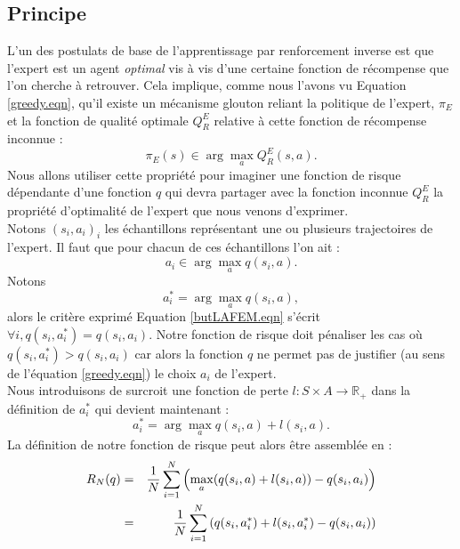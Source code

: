 \documentclass[publibook-draft]{CAp2012}
\begin{document}
\subsection{Principe}
L'un des postulats de base de l'apprentissage par renforcement inverse est que l'expert est un agent \emph{optimal} vis à vis d'une certaine fonction de récompense que l'on cherche à retrouver. Cela implique, comme nous l'avons vu Equation \eqref{greedy.eqn}, qu'il existe un mécanisme glouton reliant la politique de l'expert, $\pi_E$ et la fonction de qualité optimale $Q^E_R$ relative à cette fonction de récompense inconnue :
\begin{equation}
\pi_E(s) \in \arg\max_aQ^E_R(s,a).
\end{equation}
Nous allons utiliser cette propriété pour imaginer une fonction de risque dépendante d'une fonction $q$ qui devra partager avec la fonction inconnue $Q^E_R$ la propriété d'optimalité de l'expert que nous venons d'exprimer.\\
Notons $(s_i,a_i)_i$ les échantillons représentant une ou plusieurs trajectoires de l'expert. Il faut que pour chacun de ces échantillons l'on ait :
\begin{equation}
\label{butLAFEM.eqn}
a_i \in \arg\max_aq(s_i,a).
\end{equation}
Notons
\begin{equation}
a^*_i = \arg\max_aq(s_i,a),
\end{equation}
alors le critère exprimé Equation \eqref{butLAFEM.eqn} s'écrit $\forall i, q(s_i,a^*_i) = q(s_i,a_i)$. Notre fonction de risque doit pénaliser les cas où $q(s_i,a^*_i)>q(s_i,a_i)$ car alors la fonction $q$ ne permet pas de justifier (au sens de l'équation \eqref{greedy.eqn}) le choix $a_i$ de l'expert.\\
Nous introduisons de surcroit une fonction de perte $l : S \times A \rightarrow \mathbb{R}_+$ dans la définition de $a^*_i$ qui devient maintenant :
\begin{equation}
\label{astar.def}
a^*_i = \arg\max_aq(s_i,a) + l(s_i,a).
\end{equation}
La définition de notre fonction de risque peut alors être assemblée en :
  \begin{eqnarray}
   R_N(q) &=& {1\over N} \sum_{i=1}^N\left(\max_{a}(q(s_i,a) + l(s_i,a)) - q(s_i,a_i) \right)\\
   &=& {1\over N} \sum_{i=1}^N\left(q(s_i,a_i^*) + l(s_i,a_i^*) - q(s_i,a_i) \right)
   \end{eqnarray}
\end{document}
